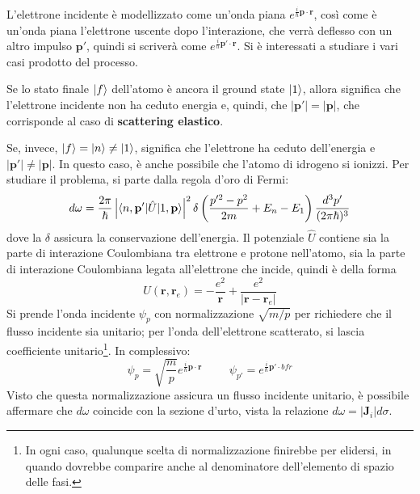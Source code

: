 \documentclass[11pt, a4paper]{scrartcl} %
\numberwithin{equation}{subsection}
\theoremstyle{style2}
\theoremstyle{style1}
\begin{document}
L'elettrone incidente \`e modellizzato come un'onda piana $e^{\frac{i}{\hbar }\mathbf{p} \cdot \mathbf{r} } $, cos\`i come \`e un'onda piana l'elettrone uscente dopo l'interazione, che verr\`a deflesso con un altro impulso $\mathbf{p} '$, quindi si scriver\`a come $e^{\frac{i}{\hbar }\mathbf{p} ' \cdot \mathbf{r } } $.
Si \`e interessati a studiare i vari casi prodotto del processo.

\vspace{.5cm} 
 Se lo stato finale $\ket{f} $ dell'atomo \`e ancora il ground state $\ket{1} $, allora significa che l'elettrone incidente non ha ceduto energia e, quindi, che $\lvert \mathbf{p} ' \rvert = \lvert  \mathbf{p}  \rvert $, che corrisponde al caso di \textbf{scattering elastico}.

Se, invece, $\ket{f}  = \ket{n} \neq \ket{1} $, significa che l'elettrone ha ceduto dell'energia e $\lvert \mathbf{p} ' \rvert \neq \lvert \mathbf{p}  \rvert $. 
In questo caso, \`e anche possibile che l'atomo di idrogeno si ionizzi.
\vspace{.5cm} 
	Per studiare il problema, si parte dalla regola d'oro di Fermi:
	\begin{equation}\label{dsw}
		d\omega = \frac{2\pi}{\hbar }\left\lvert \braket{n,\mathbf{p} '|\hat{U}|1,\mathbf{p} }  \right\rvert ^2 \delta \left(\frac{p'^2 - p^2}{2m} +E_n - E_1\right) \frac{d^3 p'}{(2\pi \hbar )^3}
	\end{equation}
	dove la $\delta $ assicura la conservazione dell'energia.
	Il potenziale $\hat{U}$ contiene sia la parte di interazione Coulombiana tra elettrone e protone nell'atomo, sia la parte di interazione Coulombiana legata all'elettrone che incide, quindi \`e della forma
	\[
		U(\mathbf{r},\mathbf{r} _e) = -\frac{e^2}{\mathbf{r} } + \frac{e^2}{\lvert \mathbf{r} -\mathbf{r} _e \rvert } 
	\] 
	Si prende l'onda incidente $\psi _p$ con normalizzazione $\sqrt{m / p} $ per richiedere che il flusso incidente sia unitario; per l'onda dell'elettrone scatterato, si lascia coefficiente unitario\footnote{In ogni caso, qualunque scelta di normalizzazione finirebbe per elidersi, in quando dovrebbe comparire anche al denominatore dell'elemento di spazio delle fasi.}. In complessivo:
\[
\psi _p = \sqrt{\frac{m}{p}} e^{\frac{i}{\hbar }\mathbf{p} \cdot \mathbf{r} } \hspace{1cm} \psi _{p'} = e^{\frac{i}{\hbar }\mathbf{p} ' \cdot bfr} 
\] 
Visto che questa normalizzazione assicura un flusso incidente unitario, \`e possibile affermare che $d\omega$ coincide con la sezione d'urto, vista la relazione $d\omega = \lvert \mathbf{J} _i \rvert d\sigma $.
\end{document}
